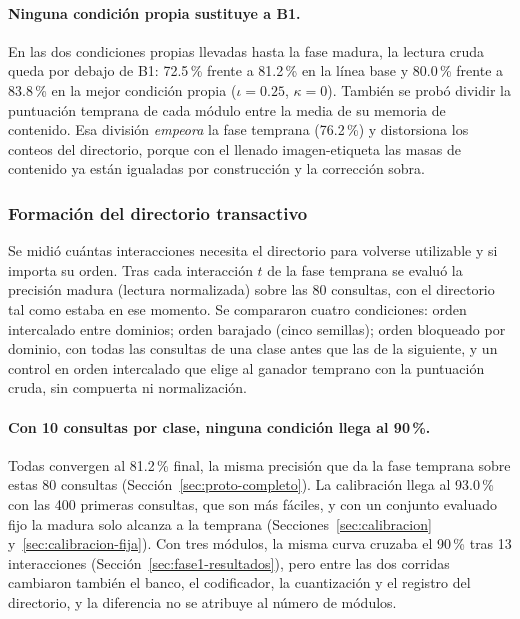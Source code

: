 \paragraph{Ninguna condición propia sustituye a B1.}
En las dos condiciones propias llevadas hasta la fase madura, la lectura cruda queda por
debajo de B1: 72.5\,\% frente a 81.2\,\% en la línea base y 80.0\,\% frente a 83.8\,\% en la
mejor condición propia ($\iota = 0.25$, $\kappa = 0$).
También se probó dividir la puntuación temprana de cada módulo entre la media de su
memoria de contenido.
Esa división \emph{empeora} la fase temprana (76.2\,\%) y distorsiona los conteos del
directorio, porque con el llenado imagen-etiqueta las masas de contenido ya están
igualadas por construcción y la corrección sobra.

\subsubsection{Formación del directorio transactivo}
\label{sec:formacion}

Se midió cuántas interacciones necesita el directorio para volverse utilizable y si
importa su orden.
Tras cada interacción $t$ de la fase temprana se evaluó la precisión madura (lectura
normalizada) sobre las 80 consultas, con el directorio tal como estaba en ese momento.
Se compararon cuatro condiciones: orden intercalado entre dominios; orden barajado
(cinco semillas); orden bloqueado por dominio, con todas las consultas de una clase
antes que las de la siguiente, y un control en orden intercalado que elige al ganador
temprano con la puntuación cruda, sin compuerta ni normalización.

\paragraph{Con 10 consultas por clase, ninguna condición llega al 90\,\%.}
Todas convergen al 81.2\,\% final, la misma precisión que da la fase temprana sobre
estas 80 consultas (Sección~\ref{sec:proto-completo}).
La calibración llega al 93.0\,\% con las 400 primeras consultas, que son más fáciles, y
con un conjunto evaluado fijo la madura solo alcanza a la temprana
(Secciones~\ref{sec:calibracion} y~\ref{sec:calibracion-fija}).
Con tres módulos, la misma curva cruzaba el 90\,\% tras 13 interacciones
(Sección~\ref{sec:fase1-resultados}), pero entre las dos corridas cambiaron también el
banco, el codificador, la cuantización y el registro del directorio, y la diferencia no
se atribuye al número de módulos.

